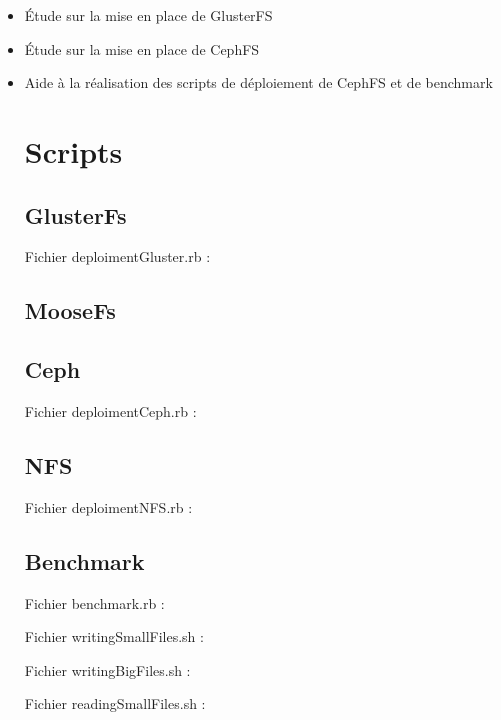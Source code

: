 \documentclass[12pt]{report}
\begin{document}
                                \begin{itemize}
                                        \item Étude sur la mise en place de GlusterFS
                                        \item Étude sur la mise en place de CephFS
                                        \item Aide à la réalisation des scripts de déploiement de CephFS et de benchmark

		\chapter{Scripts}
			\section{GlusterFs}
				Fichier deploimentGluster.rb :
				
			\section{MooseFs}
			\section{Ceph}
				Fichier deploimentCeph.rb :
				
			\section{NFS}
				Fichier deploimentNFS.rb :
				
			\section{Benchmark}
				Fichier benchmark.rb :
				

				Fichier writingSmallFiles.sh :
				

				Fichier writingBigFiles.sh :
				

				Fichier readingSmallFiles.sh :
				


\end{itemize}
\end{document}
